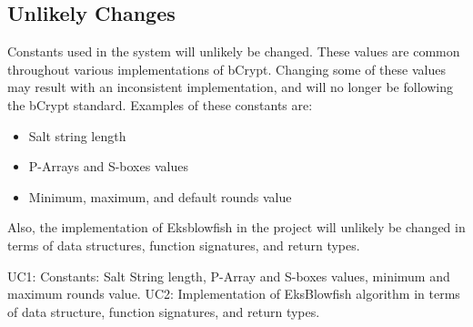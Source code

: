 \documentclass[12pt]{article}
\begin{document}
\subsection{Unlikely Changes}
Constants used in the system will unlikely be changed. These values are common throughout various implementations of bCrypt. Changing some of these values may result with an inconsistent implementation, and will no longer be following the bCrypt standard.
Examples of these constants are:
  \begin{itemize}
    \item Salt string length
    \item P-Arrays and S-boxes values
    \item Minimum, maximum, and default rounds value
  \end{itemize}
Also, the implementation of Eksblowfish in the project will unlikely be changed in terms of data structures, function signatures, and return types. \newline

UC1: Constants: Salt String length, P-Array and S-boxes values, minimum and maximum rounds value. \newline
UC2: Implementation of EksBlowfish algorithm in terms of data structure, function signatures, and return types.
\end{document}
